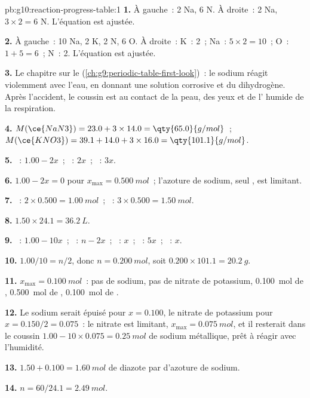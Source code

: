 \begin{solution}{pb:g10:reaction-progress-table:1}
\textbf{1.} À gauche~: 2 Na, 6 N. À droite~: 2 Na, $3 \times 2 = 6$ N.
L'équation est ajustée.

\textbf{2.} À gauche~: 10 Na, 2 K, 2 N, 6 O. À droite~: K~: 2~; Na~:
$5 \times 2 =
10$~; O~: $1 + 5 = 6$~; N~: 2. L'équation est ajustée.

\textbf{3.} Le chapitre sur le 
(\cref{ch:g9:periodic-table-first-look})~: le sodium réagit violemment
avec l'eau, en donnant une solution corrosive et du dihydrogène. Après
l'accident, le coussin est au contact de la peau, des yeux et de l'
humide de la respiration.

\textbf{4.} $M(\ce{NaN3}) = 23.0 + 3 \times 14.0 = \qty{65.0}{g/mol}$~;
$M(\ce{KNO3}) = 39.1 + 14.0 + 3 \times 16.0 = \qty{101.1}{g/mol}$.

\textbf{5.} ~: $1.00 - 2x$~; ~: $2x$~; ~: $3x$.

\textbf{6.} $1.00 - 2x = 0$ pour $x_{\max} = \qty{0.500}{mol}$~;
l'azoture de sodium, seul , est limitant.

\textbf{7.} ~: $2 \times 0.500 = \qty{1.00}{mol}$~; ~:
$3 \times 0.500 = \qty{1.50}{mol}$.

\textbf{8.} $1.50 \times 24.1 = \qty{36.2}{L}$.

\textbf{9.} ~: $1.00 - 10x$~; ~: $n - 2x$~; ~: $x$~;
~: $5x$~; ~: $x$.

\textbf{10.} $1.00/10 = n/2$, donc $n = \qty{0.200}{mol}$, soit
$0.200 \times 101.1 = \qty{20.2}{g}$.

\textbf{11.} $x_{\max} = \qty{0.100}{mol}$~: pas de sodium, pas de nitrate
de potassium, \qty{0.100}{mol} de , \qty{0.500}{mol} de
, \qty{0.100}{mol} de .

\textbf{12.} Le sodium serait épuisé pour $x = 0.100$, le nitrate de
potassium pour $x = 0.150/2 = 0.075$~: le nitrate est limitant,
$x_{\max} =
\qty{0.075}{mol}$, et il resterait dans le coussin
$1.00 - 10 \times 0.075 = \qty{0.25}{mol}$ de sodium métallique, prêt à
réagir avec l'humidité.

\textbf{13.} $1.50 + 0.100 = \qty{1.60}{mol}$ de diazote par 
d'azoture de sodium.

\textbf{14.} $n = 60 / 24.1 = \qty{2.49}{mol}$.


\end{solution}

